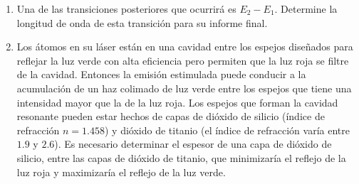 \begin{center}
\end{center}
\begin{enumerate}
    \item Una de las transiciones posteriores que ocurrirá es $E_2 - E_1$. Determine la longitud de onda de esta transición para su informe final.
    \item Los átomos en su láser están en una cavidad entre los espejos diseñados para reflejar la luz verde con alta eficiencia pero permiten que la luz roja se filtre de la cavidad. Entonces la emisión estimulada puede conducir a la acumulación de un haz colimado de luz verde entre los espejos que tiene una intensidad mayor que la de la luz roja. Los espejos que forman la cavidad resonante pueden estar hechos de capas de dióxido de silicio (índice de refracción $n = 1.458$) y dióxido de titanio (el índice de refracción varía entre $1.9$ y $2.6$). Es necesario determinar el espesor de una capa de dióxido de silicio, entre las capas de dióxido de titanio, que minimizaría el reflejo de la luz roja y maximizaría el reflejo de la luz verde.
\end{enumerate}